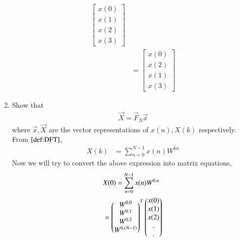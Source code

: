 \documentclass[journal,12pt,twocolumn]{IEEEtran}
\renewcommand\thesection{\arabic{section}}
\begin{document}
\begin{enumerate}[label=\arabic*.,ref=\thesection.\theenumi]
\begin{align}
                                  \begin{bmatrix}
                                    x(0) \\ 
                                    x(1) \\ 
                                    x(2) \\ 
                                    x(3)
                                  \end{bmatrix} \\
                              &= \begin{bmatrix}
                                   x(0) \\
                                   x(2) \\
                                   x(1) \\
                                   x(3)
                                 \end{bmatrix} 
        \end{align}
    \item Show that 
        \begin{align}
          \vec{X} = \vec{F}_N \vec{x}
          \label{eq:dft-mat-def}
        \end{align}
        where $\vec{x}, \vec{X}$ are the vector representations of $x(n), X(k)$ respectively.\\
    \solution From $\eqref{def:DFT}$,
       \begin{align}
         X(k) &= \sum_{n=0}^{N-1} x(n) W^{kn}
       \end{align}
      Now we will try to convert the above expression into matrix equations,
       \begin{align}
         &X(0) = \sum_{n=0}^{N-1} x(n) W^{0.n} \\
              &= \begin{pmatrix}W^{0.0}\\ W^{0.1} \\ W^{0.2} \\ W^{0.(N-1)}\end{pmatrix}^T\begin{pmatrix}
                                                                x(0)\\
                                                                x(1)\\
                                                                x(2)\\
                                                                 .\\
                                                                 .\\
\end{pmatrix}
\end{align}
\end{enumerate}
\end{document}
